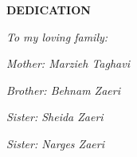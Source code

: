 \newpage
{}

{
	\centering
	\fontsize{17.5}{0}
	\textbf{DEDICATION}
\par}
\begin{center}
\textit{To my loving family:}
\end{center}
\begin{center}
	\textit{Mother: Marzieh Taghavi}
\end{center}

\begin{center}
	\textit{Brother: Behnam Zaeri}
\end{center}

\begin{center}
	\textit{Sister: Sheida Zaeri}
\end{center}

\begin{center}
	\textit{Sister: Narges Zaeri}
\end{center}
